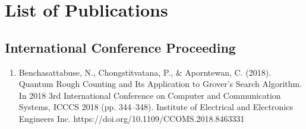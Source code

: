 \chapter{List of Publications}

\section{International Conference Proceeding}

\begin{enumerate}
    \item Benchasattabuse, N., Chongstitvatana, P., \& Aporntewan, C. (2018). Quantum Rough Counting and Its Application to Grover’s Search Algorithm. In 2018 3rd International Conference on Computer and Communication Systems, ICCCS 2018 (pp. 344–348). Institute of Electrical and Electronics Engineers Inc. https://doi.org/10.1109/CCOMS.2018.8463331
\end{enumerate}
